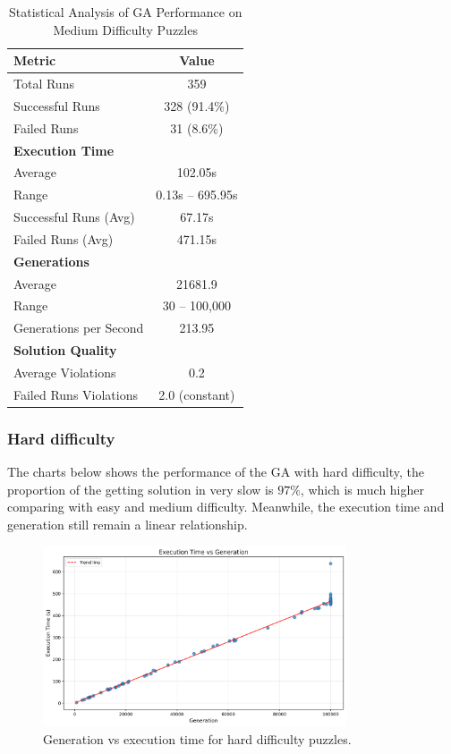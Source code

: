 \begin{table}[H]
\centering
\caption{Statistical Analysis of GA Performance on Medium Difficulty Puzzles}
\label{tab:medium_difficulty_stats}
\begin{tabular}{@{}lc@{}}
\toprule
\textbf{Metric} & \textbf{Value} \\
\midrule
Total Runs & 359 \\
Successful Runs & 328 (91.4\%) \\
Failed Runs & 31 (8.6\%) \\
\midrule
\textbf{Execution Time} & \\
Average & 102.05s \\
Range & 0.13s -- 695.95s \\
Successful Runs (Avg) & 67.17s \\
Failed Runs (Avg) & 471.15s \\
\midrule
\textbf{Generations} & \\
Average & 21681.9 \\
Range & 30 -- 100,000 \\
Generations per Second & 213.95 \\
\midrule
\textbf{Solution Quality} & \\
Average Violations & 0.2 \\
Failed Runs Violations & 2.0 (constant) \\
\bottomrule
\end{tabular}
\end{table}

\subsubsection{Hard difficulty}

The charts below shows the performance of the GA with hard difficulty, the proportion of the getting solution in very slow is $97\%$, which is much higher comparing with easy and medium difficulty.
Meanwhile, the execution time and generation still remain a linear relationship.

\begin{figure}[H]
\centering
\includegraphics[width=0.8\textwidth]{resources/generation_vs_execution_time_hard.png}
\caption{Generation vs execution time for hard difficulty puzzles.}
\label{fig:generation_vs_execution_time_hard}
\end{figure}

